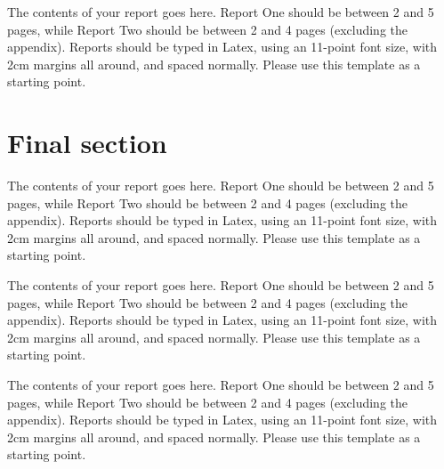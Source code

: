 \documentclass[a4paper,11pt]{article}
\begin{document}
The contents of your report goes here.  Report One should be between 2
and 5 pages, while Report Two should be between 2 and 4 pages
(excluding the appendix).  Reports should be typed in Latex, using an
11-point font size, with 2cm margins all around, and spaced normally.
Please use this template as a starting point.


\section{Final section}

The contents of your report goes here.  Report One should be between 2
and 5 pages, while Report Two should be between 2 and 4 pages
(excluding the appendix).  Reports should be typed in Latex, using an
11-point font size, with 2cm margins all around, and spaced normally.
Please use this template as a starting point.

The contents of your report goes here.  Report One should be between 2
and 5 pages, while Report Two should be between 2 and 4 pages
(excluding the appendix).  Reports should be typed in Latex, using an
11-point font size, with 2cm margins all around, and spaced normally.
Please use this template as a starting point.

The contents of your report goes here.  Report One should be between 2
and 5 pages, while Report Two should be between 2 and 4 pages
(excluding the appendix).  Reports should be typed in Latex, using an
11-point font size, with 2cm margins all around, and spaced normally.
Please use this template as a starting point.
\end{document}
